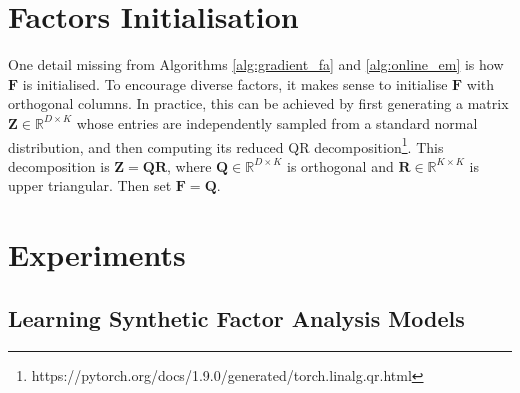 \documentclass[msc,deptreport.inf]{infthesis} %
\newcommand{\matr}[1]{\mathbf{#1}}
\newcommand{\R}{\mathbb R}
\begin{document}
\section{Factors Initialisation}\label{sec:F_init}

One detail missing from Algorithms \ref{alg:gradient_fa} and \ref{alg:online_em} is how $\matr{F}$ is initialised. To encourage diverse factors, it makes sense to initialise $\matr{F}$ with orthogonal columns. In practice, this can be achieved by first generating a matrix $\matr{Z}  \in \R^{D \times K}$ whose entries are independently sampled from a standard normal distribution, and then computing its reduced QR decomposition\footnote{https://pytorch.org/docs/1.9.0/generated/torch.linalg.qr.html}. This decomposition is $\matr{Z} = \matr{Q}\matr{R}$, where $\matr{Q} \in \R^{D \times K}$ is orthogonal and $\matr{R} \in \R^{K \times K}$ is upper triangular. Then set $\matr{F} = \matr{Q}$.


\section{Experiments}

\subsection{Learning Synthetic Factor Analysis Models}\label{ch:online_fa_experiments}
\end{document}
